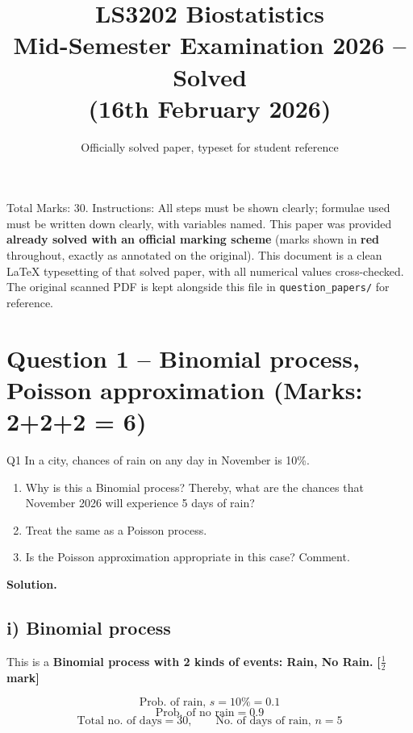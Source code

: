 \documentclass[11pt]{article}
\title{\textbf{LS3202 Biostatistics \\ Mid-Semester Examination 2026 -- Solved} \\ \large (16th February 2026)}
\author{Officially solved paper, typeset for student reference}
\date{}
\newcommand{\soln}{\par\noindent\textcolor{acolor}{\textbf{Solution.}}\quad}
\newcommand{\mk}[1]{\hfill\textcolor{markcolor}{\textbf{[#1]}}}
\begin{document}
\maketitle

\begin{tcolorbox}[colback=notecolor!8, colframe=notecolor, title=Note on this paper]
Total Marks: 30. Instructions: All steps must be shown clearly; formulae used must be written down clearly, with variables named. This paper was provided \textbf{already solved with an official marking scheme} (marks shown in \textcolor{markcolor}{\textbf{red}} throughout, exactly as annotated on the original). This document is a clean LaTeX typesetting of that solved paper, with all numerical values cross-checked. The original scanned PDF is kept alongside this file in \texttt{question\_papers/} for reference.
\end{tcolorbox}

\tableofcontents
\vspace{1em}

\section{Question 1 -- Binomial process, Poisson approximation (Marks: 2+2+2 = 6)}
\begin{question}{Q1}
In a city, chances of rain on any day in November is 10\%.
\begin{enumerate}[label=\roman*)]
\item Why is this a Binomial process? Thereby, what are the chances that November 2026 will experience 5 days of rain?
\item Treat the same as a Poisson process.
\item Is the Poisson approximation appropriate in this case? Comment.
\end{enumerate}
\end{question}

\soln

\subsection*{i) Binomial process}
This is a \textbf{Binomial process with 2 kinds of events: Rain, No Rain.} \mk{$\frac{1}{2}$ mark}

\[
\text{Prob. of rain, } s = 10\% = 0.1
\]
\[
\text{Prob. of no rain} = 0.9
\]
\[
\text{Total no. of days} = 30, \qquad \text{No. of days of rain, } n=5
\]
\end{document}
